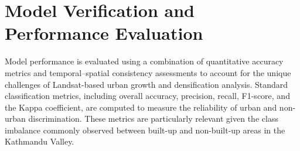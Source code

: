 \documentclass[main]{subfiles}
\begin{document}





\section{Model Verification and Performance Evaluation}

Model performance is evaluated using a combination of quantitative accuracy metrics and temporal–spatial consistency assessments to account for the unique challenges of Landsat-based urban growth and densification analysis. Standard classification metrics, including overall accuracy, precision, recall, F1-score, and the Kappa coefficient, are computed to measure the reliability of urban and non-urban discrimination. These metrics are particularly relevant given the class imbalance commonly observed between built-up and non-built-up areas in the Kathmandu Valley.
\end{document}
